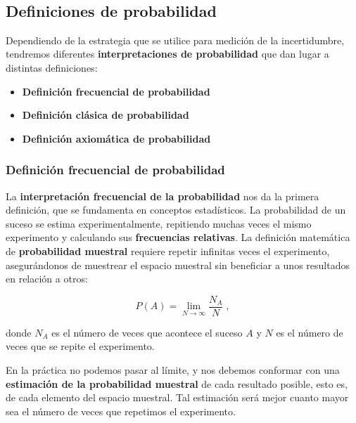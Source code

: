 \documentclass[11pt]{article}
\providecommand{\tightlist}{%
      \setlength{\itemsep}{0pt}\setlength{\parskip}{0pt}}
\begin{document}
    \begin{center}
    \end{center}
    { \hspace*{\fill} \\}
    
    \subsection*{Definiciones de
probabilidad}\label{definiciones-de-probabilidad}

Dependiendo de la estrategia que se utilice para medición de la
incertidumbre, tendremos diferentes \textbf{interpretaciones de
probabilidad} que dan lugar a distintas definiciones:

\begin{itemize}
\tightlist
\item
  \textbf{Definición frecuencial de probabilidad}
\item
  \textbf{Definición clásica de probabilidad}
\item
  \textbf{Definición axiomática de probabilidad}
\end{itemize}

    \subsubsection*{Definición frecuencial de
probabilidad}\label{definiciuxf3n-frecuencial-de-probabilidad}

La \textbf{interpretación frecuencial de la probabilidad} nos da la
primera definición, que se fundamenta en conceptos estadísticos. La
probabilidad de un suceso se estima experimentalmente, repitiendo muchas
veces el mismo experimento y calculando sus \textbf{frecuencias
relativas}. La definición matemática de \textbf{probabilidad muestral}
requiere repetir infinitas veces el experimento, asegurándonos de
muestrear el espacio muestral sin beneficiar a unos resultados en
relación a otros:

\[P(A) = \lim_{N \to \infty}\frac{N_A}{N}\; ,\]

donde \(N_A\) es el número de veces que acontece el suceso \(A\) y \(N\)
es el número de veces que se repite el experimento.

    En la práctica no podemos pasar al límite, y nos debemos conformar con
una \textbf{estimación de la probabilidad muestral} de cada resultado
posible, esto es, de cada elemento del espacio muestral. Tal estimación
será mejor cuanto mayor sea el número de veces que repetimos el
experimento.
\end{document}
